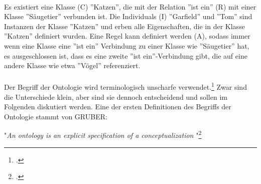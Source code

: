 \documentclass[12pt,a4paper]{article}
\begin{document}
\\
Es existiert eine Klasse (C) ''Katzen'', die mit der Relation ''ist ein'' (R) mit einer Klasse ''Säugetier'' verbunden ist.  Die Individuals (I) ''Garfield'' und ''Tom'' sind Instanzen der Klasse ''Katzen'' und erben alle Eigenschaften, die in der Klasse ''Katzen'' definiert wurden. Eine Regel kann definiert werden (A), sodass immer wenn eine Klasse eine ''ist ein'' Verbindung zu einer Klasse wie ''Säugetier'' hat, es ausgeschlossen ist, dass es eine zweite ''ist ein''-Verbindung  gibt, die auf eine andere Klasse wie etwa ''Vögel'' referenziert. 
\\
\\
Der Begriff der Ontologie wird terminologisch unscharfe verwendet.\footcite[Vgl.][S.1]{gruber1993translation} Zwar sind die Unterschiede klein, aber sind sie dennoch entscheidend und sollen im Folgenden diskutiert werden.
Eine der ersten Definitionen des Begriffs der Ontologie stammt von GRUBER: 

\begin{center}
 "\textit{An ontology is an explicit specification of a conceptualization}
"\footcite[][S.69]{hoekstra2009ontology}
\end{center}
\end{document}
